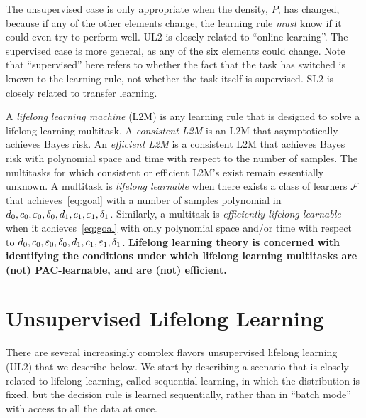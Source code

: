 \documentclass{article}
\begin{document}
The unsupervised case is only appropriate when the density, $P$, has changed, because if any of the other elements change, the learning rule \emph{must} know if it could even try to perform well. UL2 is closely related to ``online learning''.  The supervised case is more general, as any of the six elements could change. Note that ``supervised'' here refers to whether the fact that the task has switched is known to the learning rule, not whether the task itself is supervised.  SL2 is closely related to transfer learning. 



A \emph{lifelong learning machine} (L2M) is any learning rule that is designed to solve a lifelong learning multitask. A \emph{consistent L2M} is an L2M that asymptotically achieves Bayes risk.  An \emph{efficient L2M}  is a consistent L2M that achieves Bayes risk with polynomial space and time with respect to the number of samples. The multitasks for which consistent or efficient L2M's exist remain essentially unknown.
A multitask is \emph{lifelong learnable} when there exists a class of learners $\mathcal{F}$ that achieves~\eqref{eq:goal} with a number of samples polynomial in $d_0,c_0,\varepsilon_0,\delta_0, d_1, c_1, \varepsilon_1, \delta_1$.  Similarly, a multitask is \emph{efficiently lifelong learnable} when it achieves~\eqref{eq:goal} with only polynomial space and/or time with respect to $d_0,c_0,\varepsilon_0,\delta_0, d_1, c_1, \varepsilon_1, \delta_1$.
\textbf{Lifelong learning theory is concerned with identifying the conditions under which lifelong learning multitasks are (not) PAC-learnable, and are (not) efficient.} 







\section{Unsupervised Lifelong Learning}
\label{sec:continual}

There are several increasingly complex flavors unsupervised lifelong learning (UL2) that we describe below.  We start by describing a scenario that is closely related to lifelong learning, called sequential learning, in which the distribution is fixed, but the decision rule is learned sequentially, rather than in ``batch mode'' with access to all the data at once. 
\end{document}
